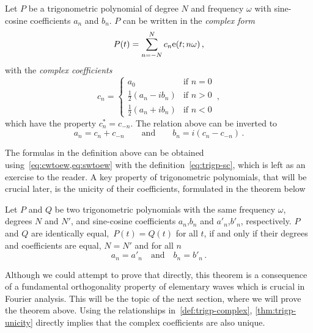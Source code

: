 \begin{definition}
  \label{def:trigp-complex}
  Let $P$ be a trigonometric polynomial of degree $N$ and frequency $\omega$ with
  sine-cosine coefficients $a_n$ and $b_n$. $P$ can be written in the \emph{complex form}
  \begin{equation}
    P(t)=\sum_{n=-N}^{N}c_n\mathrm{e}(t;n\omega)\,,
  \end{equation}
  with the \emph{complex coefficients}
  \begin{equation}
    c_n =
    \begin{cases}
      a_0 &\text{if~}n=0\\
      \frac{1}{2}(a_n-ib_n)&\text{if~}n>0\\
      \frac{1}{2}(a_n+ib_n)&\text{if~}n<0
    \end{cases}
    \,,\label{eq:ab-to-c}
  \end{equation}
  which have the property $c_n^*=c_{-n}$. The relation above can be inverted
  to
  \begin{equation}
    a_n=c_n+c_{-n}\qquad\text{and}\qquad
    b_n=i(c_n-c_{-n})\,.
  \end{equation}
\end{definition}
The formulas in the definition above can be obtained using~\cref{eq:cwtoew,eq:swtoew} with the definition~\cref{eq:trigp-sc}, which is left as an exercise to the reader. A key property of trigonometric polynomials, that will be crucial later, is the unicity of their coefficients, formulated in the theorem below
\begin{theorem}
  \label{thm:trigp-unicity}
  Let $P$ and $Q$ be two trigonometric polynomials with the same frequency $\omega$, degrees $N$ and $N'$, and sine-cosine coefficients $a_n$,$b_n$ and $a'_n$,$b'_n$, respectively. $P$ and $Q$ are identically equal,~\ie $P(t)=Q(t)$ for all $t$, if and only if their degrees and coefficients are equal, \ie $N=N'$ and for all $n$
  \begin{equation}
    a_n=a'_n\quad\text{and}\quad b_n=b'_n\,.
  \end{equation}
\end{theorem}
Although we could attempt to prove that directly, this theorem is a consequence of a fundamental
orthogonality property of elementary waves which is crucial in Fourier analysis. This will be the topic of
the next section, where we will prove the theorem above. Using the relationships in~\cref{def:trigp-complex}, \cref{thm:trigp-unicity} directly implies that the complex coefficients are also unique.

